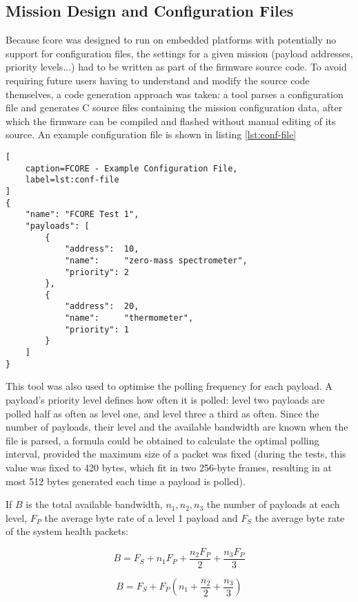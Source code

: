 \subsection{Mission Design and Configuration Files}
\label{ssec:conf-file}

Because \acrshort{fcore} was designed to run on embedded platforms with 
potentially no support for configuration files, the settings for a given mission
(payload addresses, priority levels...) had to be written as part of the
firmware source code. To avoid requiring future users having to understand and
modify the source code themselves, a code generation approach was taken: a
tool parses a configuration file and generates C source files containing the
mission configuration data, after which the firmware can be compiled and flashed
without manual editing of its source. An example configuration file is shown
in listing \ref{lst:conf-file}

\begin{lstlisting}[
    caption=FCORE - Example Configuration File,
    label=lst:conf-file
]
{
    "name": "FCORE Test 1",
    "payloads": [
        {
            "address":  10,
            "name":     "zero-mass spectrometer",
            "priority": 2
        },
        {
            "address":  20,
            "name":     "thermometer",
            "priority": 1
        }
    ]
}
\end{lstlisting}

This tool was also used to optimise the polling frequency for each payload.
A payload's priority level defines how often it is polled: level two payloads
are polled half as often as level one, and level three a third as often. Since
the number of payloads, their level and the available bandwidth are known when
the file is parsed, a formula could be obtained to calculate the optimal
polling interval, provided the maximum size of a packet was fixed (during the
tests, this value was fixed to 420 bytes, which fit in two 256-byte frames,
resulting in at most 512 bytes generated each time a payload is polled).

If $B$ is the total available bandwidth, $n_1, n_2, n_3$ the number of payloads
at each level, $F_P$ the average byte rate of a level 1 payload and $F_S$ the
average byte rate of the system health packets:

\[B = F_S + n_{1}F_{P} + \frac{n_{2}F_{P}}{2} + \frac{n_{3}F_{P}}{3} \]

\[B = F_S + F_{P}(n_{1} + \frac{n_2}{2} + \frac{n_3}{3}) \]


